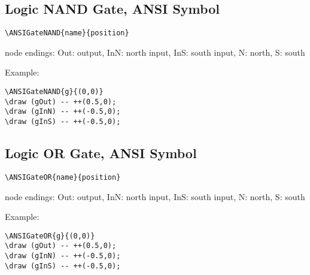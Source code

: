 \documentclass[parskip=full]{scrartcl}
\begin{document}
\subsection{Logic NAND Gate, ANSI Symbol}

\begin{verbatim}
\ANSIGateNAND{name}{position}
\end{verbatim}
node endings: Out: output,
              InN: north input, InS: south input,
              N: north, S: south

Example:\\
\begin{minipage}{0.8\textwidth}
\begin{verbatim}
\ANSIGateNAND{g}{(0,0)}
\draw (gOut) -- ++(0.5,0);
\draw (gInN) -- ++(-0.5,0);
\draw (gInS) -- ++(-0.5,0);
\end{verbatim}
\end{minipage}
\begin{minipage}{0.19\textwidth}
\end{minipage}

\subsection{Logic OR Gate, ANSI Symbol}

\begin{verbatim}
\ANSIGateOR{name}{position}
\end{verbatim}
node endings: Out: output,
              InN: north input, InS: south input,
              N: north, S: south

Example:\\
\begin{minipage}{0.8\textwidth}
\begin{verbatim}
\ANSIGateOR{g}{(0,0)}
\draw (gOut) -- ++(0.5,0);
\draw (gInN) -- ++(-0.5,0);
\draw (gInS) -- ++(-0.5,0);
\end{verbatim}
\end{minipage}
\begin{minipage}{0.19\textwidth}
\end{minipage}
\end{document}

